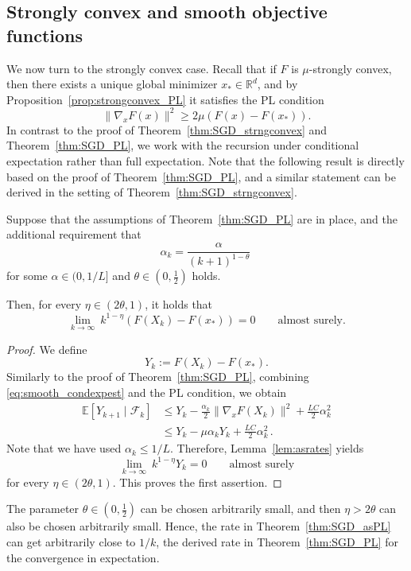 \documentclass[12pt,openany]{book}
\theoremstyle{definition}
\theoremstyle{definition}
\begin{document}
\subsection{Strongly convex and smooth objective functions}
We now turn to the strongly convex case. Recall that if $F$ is $\mu$-strongly convex, then there exists a unique global minimizer $x_\ast\in\mathbb{R}^d$, and by Proposition~\ref{prop:strongconvex_PL} it satisfies the PL condition
\[
\|\nabla_xF(x)\|^2\geq 2\mu(F(x)-F(x_\ast)).
\]
In contrast to the proof of Theorem~\ref{thm:SGD_strngconvex} and Theorem~\ref{thm:SGD_PL}, we work with the recursion under conditional expectation rather than full expectation. Note that the following result is directly based on the proof of Theorem~\ref{thm:SGD_PL}, and a similar statement can be derived in the setting of Theorem~\ref{thm:SGD_strngconvex}.
\begin{thm}\label{thm:SGD_asPL}
Suppose that the assumptions of Theorem~\ref{thm:SGD_PL} are in place, and the additional requirement that 
\[
\alpha_k=\frac{\alpha}{(k+1)^{1-\theta}}\
\]
for some $\alpha\in(0,1/L]$ and $\theta\in(0,\frac12)$ holds.

Then, for every $\eta\in(2\theta,1)$, it holds that
\[
\lim_{k\to\infty}\ k^{1-\eta}(F(X_k)-F(x_\ast))
=0
\qquad \text{almost surely}.
\]
\end{thm}

\begin{proof}
We define
\[
Y_k:=F(X_k)-F(x_\ast).
\]
Similarly to the proof of Theorem~\ref{thm:SGD_PL}, combining \eqref{eq:smooth_condexpest} and the PL condition, we obtain
\[
\begin{aligned}
\mathbb{E}[Y_{k+1}\mid \mathcal{F}_k]
&\leq
Y_k
-
\frac{\alpha_k}2
\|\nabla_xF(X_k)\|^2
+
\frac{LC}{2}\alpha_k^2\\
&\leq Y_k
-
\mu\alpha_kY_k
+
\frac{LC}{2}\alpha_k^2
\,.
\end{aligned}
\]
Note that we have used $\alpha_k\le 1/L$. Therefore, Lemma~\ref{lem:asrates} yields
\[
\lim_{k\to\infty}\ k^{1-\eta}Y_k
= 0\qquad \text{almost surely}
\]
for every $\eta\in(2\theta,1)$. This proves the first assertion.
\end{proof}

The parameter $\theta\in(0,\frac12)$ can be chosen arbitrarily small, and then $\eta>2\theta$ can also be chosen arbitrarily small. Hence, the rate in Theorem~\ref{thm:SGD_asPL} can get arbitrarily close to $1/k$, the derived rate in Theorem~\ref{thm:SGD_PL} for the convergence in expectation. 
\end{document}
